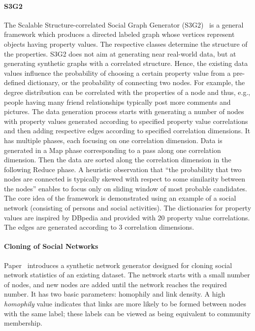 \paragraph{S3G2} The Scalable Structure-correlated Social Graph Generator (S3G2)~\cite{Pham2013} is a general framework which produces a directed labeled graph whose vertices represent objects having property values. The respective classes determine the structure of the properties. S3G2 does not aim at generating near real-world data, but at generating synthetic graphs with a correlated structure. Hence, the existing data values influence the probability of choosing a certain property value from a pre-defined dictionary, or the probability of connecting two nodes. For example, the degree distribution can be correlated with the properties of a node and thus, e.g., people having many friend relationships typically post more comments and pictures. The data generation process starts with generating a number of nodes with property values generated according to specified property value correlations and then adding respective edges according to specified correlation dimensions. It has multiple phases, each focusing on one correlation dimension. Data is generated in a Map phase corresponding to a pass along one correlation dimension. Then the data are sorted along the correlation dimension in the following Reduce phase. A heuristic observation that ``the probability that two nodes are connected is typically skewed with respect to some similarity between the nodes'' enables to focus only on sliding window of most probable candidates. The core idea of the framework is demonstrated using an example of a social network (consisting of persons and social activities).  The dictionaries for property values are inspired by DBpedia and provided with 20 property value correlations. The edges are generated according to 3 correlation dimensions.


\paragraph{Cloning of Social Networks} Paper~\cite{Sukthankar-SocialInfo2014}
introduces a synthetic network generator designed for cloning social network
statistics of an existing dataset. The network starts with a small number of
nodes, and new nodes are added until the network reaches the required number. It
has two basic parameters: homophily and link density. A high \emph{homophily}
value indicates that links are more likely to be formed between nodes with the
same label; these labels can be viewed as being equivalent to community
membership.

